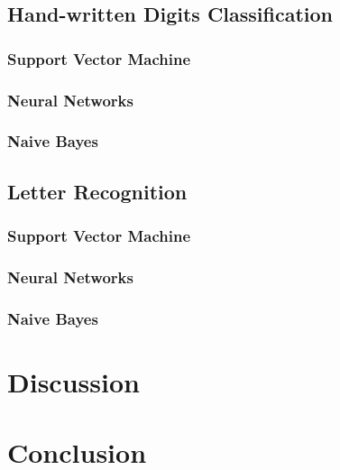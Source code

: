 \documentclass[11pt]{article}
\begin{document}
\subsection{Hand-written Digits Classification}
\subsubsection{Support Vector Machine}

\subsubsection{Neural Networks}

\subsubsection{Naive Bayes}

\subsection{Letter Recognition}
\subsubsection{Support Vector Machine}

\subsubsection{Neural Networks}

\subsubsection{Naive Bayes}

\section{Discussion}

\section{Conclusion}




\end{document}
